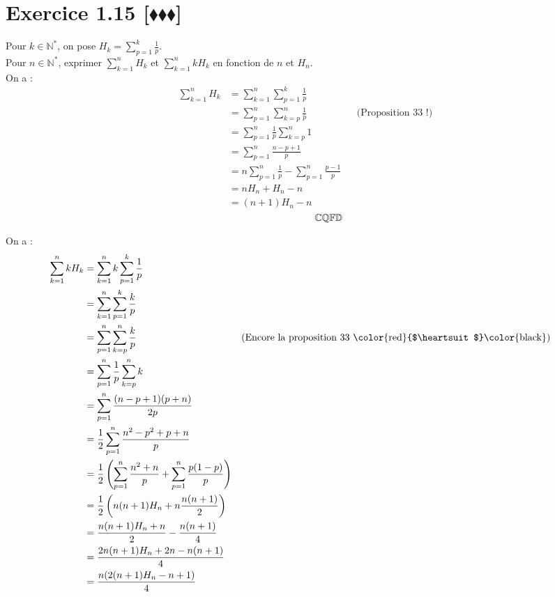 \documentclass[10pt]{article}
\begin{document}
\section*{Exercice 1.15 [$\blacklozenge\blacklozenge\blacklozenge$]}
\begin{tcolorbox}[enhanced, width=7in, center, size=fbox, fontupper=\large, drop shadow southwest]
    Pour $k\in\mathbb{N}^*$, on pose $H_k=\sum\limits^k_{p=1}{\frac{1}{p}}$.\\
    Pour $n\in\mathbb{N}^*$, exprimer $\sum\limits^n_{k=1}H_k$ et $\sum\limits^n_{k=1}kH_k$ en fonction de $n$ et $H_n$.\\
    On a :
    \begin{align*}
        \sum^n_{k=1}{H_k}
        &=\sum^n_{k=1}{\sum^k_{p=1}{\frac{1}{p}}}\\
        &=\sum^n_{p=1}{\sum^n_{k=p}{\frac{1}{p}}} && \text{(Proposition 33 !)}\\
        &=\sum^n_{p=1}{\frac{1}{p}\sum^n_{k=p}{1}}\\
        &=\sum^n_{p=1}{\frac{n-p+1}{p}}\\
        &=n\sum^n_{p=1}{\frac{1}{p}}-\sum^n_{p=1}{\frac{p-1}{p}}\\
        &=nH_n + H_n - n\\
        &=(n+1)H_n - n
    \end{align*}
    $\rightline{$\mathbb{CQFD}$}$
\end{tcolorbox}

\begin{tcolorbox}[enhanced, width=7in, center, size=fbox, fontupper=\large, drop shadow southwest]
    On a :
    \begin{align*}
        \sum^n_{k=1}{kH_k}
        &=\sum^n_{k=1}{k\sum^k_{p=1}{\frac{1}{p}}}\\
        &=\sum^n_{k=1}{\sum^k_{p=1}{\frac{k}{p}}}\\
        &=\sum^n_{p=1}{\sum^n_{k=p}{\frac{k}{p}}} && \text{(Encore la proposition 33 \color{red}{$\heartsuit$}\color{black})}\\
        &=\sum^n_{p=1}{\frac{1}{p}\sum^n_{k=p}{k}}\\
        &=\sum^n_{p=1}{\frac{(n-p+1)(p+n)}{2p}}\\
        &=\frac{1}{2}\sum^n_{p=1}{\frac{n^2-p^2+p+n}{p}}\\
        &=\frac{1}{2}\left(\sum^n_{p=1}{\frac{n^2+n}{p}}+\sum^{n}_{p=1}{\frac{p(1-p)}{p}}\right)\\
        &=\frac{1}{2}\left(n(n+1)H_n+n\frac{n(n+1)}{2}\right)\\
        &=\frac{n(n+1)H_n+n}{2}-\frac{n(n+1)}{4}\\
        &=\frac{2n(n+1)H_n+2n-n(n+1)}{4}\\
        &=\frac{n(2(n+1)H_n-n+1)}{4}
    \end{align*}
\end{tcolorbox}


    
\end{document}

